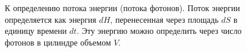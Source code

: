 \begin{figure}
\centering



\caption{К определению потока энергии (потока фотонов). Поток энергии
  определяется как энергия $dH$, перенесенная через площадь $dS$ в
  единицу времени $dt$. Эту энергию можно определить через число
  фотонов в цилиндре объемом $V$.}
\label{figPart1Ch2_add1}
\end{figure}
